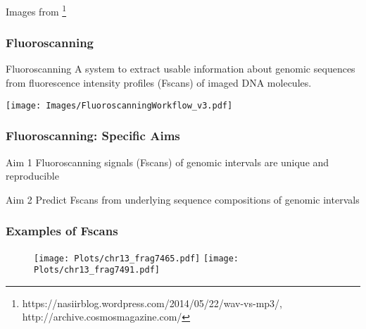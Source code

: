 \documentclass[10pt,dvipsnames,table]{beamer}
\begin{document}
\begin{frame}
\begin{columns}[t]
\begin{column}{0.5\textwidth}
\end{column}
\end{columns}
{\tiny{Images from \footnote{\tiny{https://nasiirblog.wordpress.com/2014/05/22/wav-vs-mp3/, http://archive.cosmosmagazine.com/}} }}
\end{frame}

\begin{frame}
\frametitle{Fluoroscanning}
\begin{block}{Fluoroscanning}
A system to extract usable information about genomic sequences from fluorescence intensity profiles (Fscans) of imaged DNA molecules. 
\end{block}
\end{frame}

\begin{frame}
\texttt{[image: Images/FluoroscanningWorkflow\_v3.pdf]}
\end{frame}

\begin{frame}
\frametitle{Fluoroscanning: Specific Aims}
\begin{block}{Aim 1}
Fluoroscanning signals (Fscans) of genomic intervals are unique and reproducible
\end{block}
\vspace{0.5in}
\begin{block}{Aim 2}
Predict Fscans from underlying sequence compositions of genomic intervals
\end{block}

\end{frame}

\begin{frame}
\frametitle{Examples of Fscans}
\begin{figure}[t]
\texttt{[image: Plots/chr13\_frag7465.pdf]}
\texttt{[image: Plots/chr13\_frag7491.pdf]}
\end{figure}
\end{frame}
\end{document}
